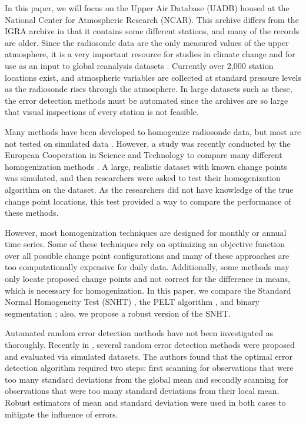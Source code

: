\documentclass[12pt]{article}
\begin{document}
\begin{doublespacing}
In this paper, we will focus on the Upper Air Database (UADB) housed at the National Center for Atmospheric Research (NCAR). This archive differs from the IGRA archive in that it contains some different stations, and many of the records are older. Since the radiosonde data are the only measured values of the upper atmosphere, it is a very important resource for studies in climate change \cite{elliott91, eskridge95} and for use as an input to global reanalysis datasets \cite{kalnay96, kanamitsu02}. Currently over 2,000 station locations exist, and atmospheric variables are collected at standard pressure levels as the radiosonde rises through the atmosphere. In large datasets such as these, the error detection methods must be automated since the archives are so large that visual inspections of every station is not feasible.

Many methods have been developed to homogenize radiosonde data, but most are not tested on simulated data \cite{eskridge95,haimberger08,haimberger07,lanzante96,lanzante03,venema12}.  However, a study was recently conducted by the European Cooperation in Science and Technology to compare many different homogenization methods \cite{venema12}.  A large, realistic dataset with known change points was simulated, and then researchers were asked to test their homogenization algorithm on the dataset.  As the researchers did not have knowledge of the true change point locations, this test provided a way to compare the performance of  these  methods.  

However, most homogenization techniques are designed for monthly or annual time series.  Some of these techniques rely on optimizing an objective function over all possible change point configurations \cite{killick12, li14, lu10, scott74} and many of these approaches are too computationally expensive for daily data.  Additionally, some methods may only locate proposed change points and not correct for the difference in means, which is necessary for homogenization.  In this paper, we compare the Standard Normal Homogeneity Test (SNHT) \cite{alexandersson86}, the PELT algorithm \cite{killick12}, and binary segmentation \cite{scott74}; also, we propose a robust version of the SNHT.

Automated random error detection methods have not been investigated as thoroughly.  Recently in \cite{bell14}, several random error detection methods were proposed and evaluated via simulated datasets.  The authors found that the optimal error detection algorithm required two steps: first scanning for observations that were too many standard deviations from the global mean and secondly scanning for observations that were too many standard deviations from their local mean.  Robust estimators of mean and standard deviation were used in both cases to mitigate the influence of errors.


\end{doublespacing}
\end{document}
